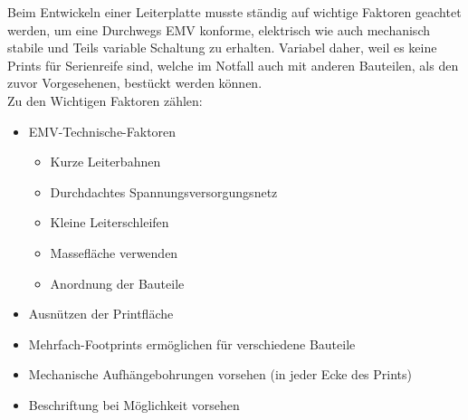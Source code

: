 Beim Entwickeln einer Leiterplatte musste ständig auf wichtige Faktoren geachtet werden, um eine Durchwegs EMV konforme, elektrisch wie auch mechanisch stabile und Teils variable Schaltung zu erhalten.
Variabel daher, weil es keine Prints für Serienreife sind, welche im Notfall auch mit anderen Bauteilen, als den zuvor Vorgesehenen, bestückt werden können.\\
Zu den Wichtigen Faktoren zählen:
\begin{itemize}
	\item EMV-Technische-Faktoren
	\begin{itemize}
		\item Kurze Leiterbahnen
		\item Durchdachtes Spannungsversorgungsnetz
		\item Kleine Leiterschleifen
		\item Massefläche verwenden
		\item Anordnung der Bauteile
	\end{itemize}
	\item Ausnützen der Printfläche
	\item Mehrfach-Footprints ermöglichen für verschiedene Bauteile
	\item Mechanische Aufhängebohrungen vorsehen (in jeder Ecke des Prints)
	\item Beschriftung bei Möglichkeit vorsehen
\end{itemize}


